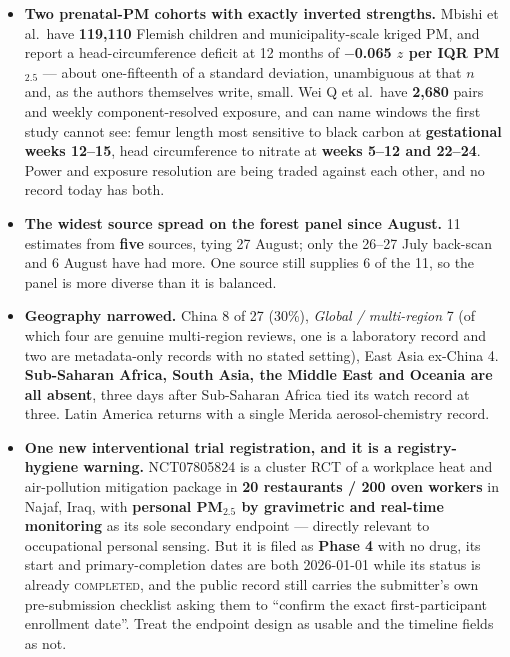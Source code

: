 \documentclass[10pt]{article}
\begin{document}
\begin{itemize}
\item \textbf{Two prenatal-PM cohorts with exactly inverted strengths.} Mbishi et al.\ have
\textbf{119{,}110} Flemish children and municipality-scale kriged PM, and report a
head-circumference deficit at 12 months of \textbf{$-$0.065 $z$ per IQR PM$_{2.5}$} --- about
one-fifteenth of a standard deviation, unambiguous at that $n$ and, as the authors
themselves write, small. Wei Q et al.\ have \textbf{2{,}680} pairs and weekly
component-resolved exposure, and can name windows the first study cannot see: femur length
most sensitive to black carbon at \textbf{gestational weeks 12--15}, head circumference to
nitrate at \textbf{weeks 5--12 and 22--24}. Power and exposure resolution are being traded
against each other, and no record today has both.

\item \textbf{The widest source spread on the forest panel since August.} 11 estimates from
\textbf{five} sources, tying 27 August; only the 26--27 July back-scan and 6 August have had
more. One source still supplies 6 of the 11, so the panel is more diverse than it is
balanced.

\item \textbf{Geography narrowed.} China 8 of 27 (30\%), \textit{Global / multi-region} 7
(of which four are genuine multi-region reviews, one is a laboratory record and two are
metadata-only records with no stated setting), East Asia ex-China 4. \textbf{Sub-Saharan
Africa, South Asia, the Middle East and Oceania are all absent}, three days after
Sub-Saharan Africa tied its watch record at three. Latin America returns with a single
Merida aerosol-chemistry record.

\item \textbf{One new interventional trial registration, and it is a registry-hygiene
warning.} NCT07805824 is a cluster RCT of a workplace heat and air-pollution mitigation
package in \textbf{20 restaurants / 200 oven workers} in Najaf, Iraq, with
\textbf{personal PM$_{2.5}$ by gravimetric and real-time monitoring} as its sole secondary
endpoint --- directly relevant to occupational personal sensing. But it is filed as
\textbf{Phase 4} with no drug, its start and primary-completion dates are both 2026-01-01
while its status is already \textsc{completed}, and the public record still carries the
submitter's own pre-submission checklist asking them to ``confirm the exact first-participant
enrollment date''. Treat the endpoint design as usable and the timeline fields as not.


\end{itemize}
\end{document}
